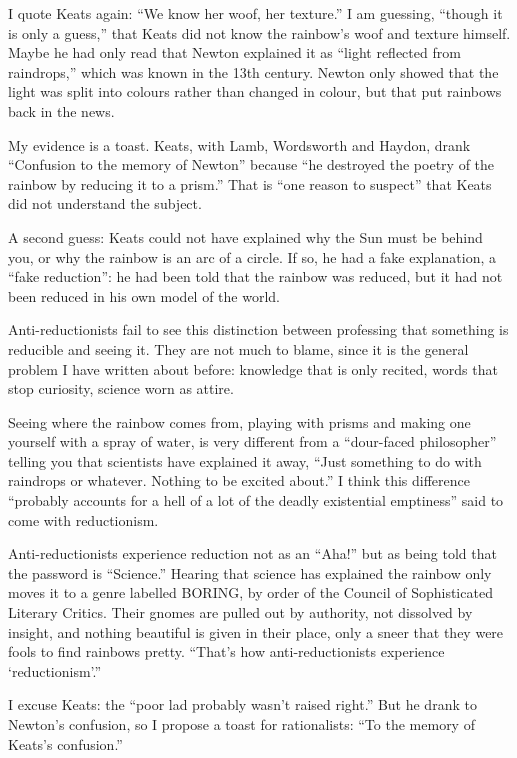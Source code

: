 
I quote Keats again: ``We know her woof, her texture.'' I am guessing, ``though it is only a guess,'' that Keats did not know the rainbow's woof and texture himself. Maybe he had only read that Newton explained it as ``light reflected from raindrops,'' which was known in the 13th century. Newton only showed that the light was split into colours rather than changed in colour, but that put rainbows back in the news. 

My evidence is a toast. Keats, with Lamb, Wordsworth and Haydon, drank ``Confusion to the memory of Newton'' because ``he destroyed the poetry of the rainbow by reducing it to a prism.'' That is ``one reason to suspect'' that Keats did not understand the subject. 

A second guess: Keats could not have explained why the Sun must be behind you, or why the rainbow is an arc of a circle. If so, he had a fake explanation, a ``fake reduction'': he had been told that the rainbow was reduced, but it had not been reduced in his own model of the world.

Anti-reductionists fail to see this distinction between professing that something is reducible and seeing it. They are not much to blame, since it is the general problem I have written about before: knowledge that is only recited, words that stop curiosity, science worn as attire.

Seeing where the rainbow comes from, playing with prisms and making one yourself with a spray of water, is very different from a ``dour-faced philosopher'' telling you that scientists have explained it away, ``Just something to do with raindrops or whatever. Nothing to be excited about.'' I think this difference ``probably accounts for a hell of a lot of the deadly existential emptiness'' said to come with reductionism.

Anti-reductionists experience reduction not as an ``Aha!'' but as being told that the password is ``Science.'' Hearing that science has explained the rainbow only moves it to a genre labelled BORING, by order of the Council of Sophisticated Literary Critics. Their gnomes are pulled out by authority, not dissolved by insight, and nothing beautiful is given in their place, only a sneer that they were fools to find rainbows pretty. ``That's how anti-reductionists experience `reductionism'.'' 

I excuse Keats: the ``poor lad probably wasn't raised right.'' But he drank to Newton's confusion, so I propose a toast for rationalists: ``To the memory of Keats's confusion.''
